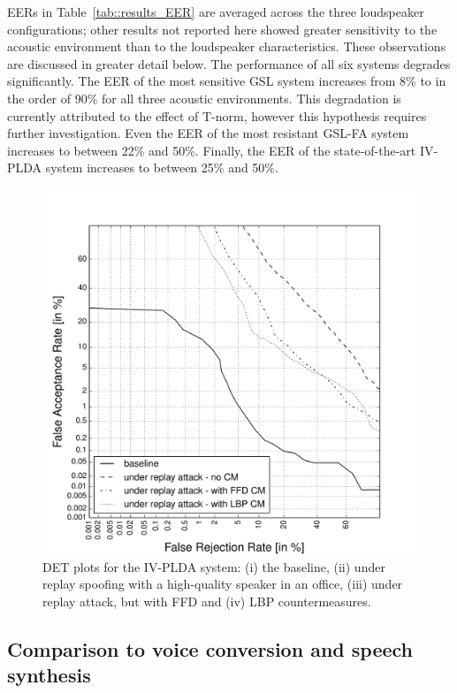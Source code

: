 EERs in Table~\ref{tab::results_EER} are averaged across the three loudspeaker configurations; other results not reported here showed greater sensitivity to the acoustic environment than to the loudspeaker characteristics.  These observations are discussed in greater detail below.  
The performance of all six systems degrades significantly.
The EER of the most sensitive GSL system increases from 8\% to in the order of 90\% for all three acoustic environments. This degradation is currently attributed to the effect of T-norm, however this hypothesis requires further investigation.
Even the EER of the most resistant GSL-FA system increases to between 22\% and 50\%.  
Finally, the EER of the state-of-the-art IV-PLDA system increases to between 25\% and 50\%.  %


\begin{figure}[!t]
	\centering
	\includegraphics[width=1\linewidth]{Figs/DET_IVPLDA_counter_Behr.pdf}
	\caption{DET plots for the IV-PLDA system: (i) the baseline, (ii) under replay spoofing with a high-quality speaker in an office, (iii) under replay attack, but with FFD and (iv) LBP countermeasures.}
	\label{fig::DETs_replay_IV}
\end{figure}

\subsection{Comparison to voice conversion and speech synthesis}


